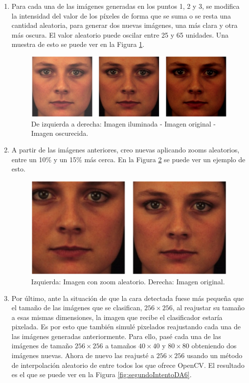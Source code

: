 \documentclass[a4paper,11pt]{book}
\begin{document}
\begin{enumerate}
	\item Para cada una de las imágenes generadas en los puntos 1, 2 y 3, se modifica la intensidad del valor de los píxeles de forma que se suma o se resta una cantidad aleatoria, para generar dos nuevas imágenes, una más clara y otra más oscura. El valor aleatorio puede oscilar entre 25 y 65 unidades. Una muestra de esto se puede ver en la Figura \ref{fig:segundoIntentoDA4}.
		\begin{figure}[h]
			\centering
			\includegraphics[width=0.9\linewidth]{imagenes/segundoIntentoDA4}
			\caption[Experimento 2 Iluminación]{De izquierda a derecha: Imagen iluminada - Imagen original - Imagen oscurecida.}
			\label{fig:segundoIntentoDA4}
		\end{figure}
	\item A partir de las imágenes anteriores, creo nuevas aplicando zooms aleatorios, entre un 10\% y un 15\% más cerca. En la Figura \ref{fig:segundoIntentoDA5} se puede ver un ejemplo de esto.
		\begin{figure}[h]
			\centering
			\includegraphics[width=0.7\linewidth]{imagenes/segundoIntentoDA5}
			\caption[Experimento 2 Zooms]{Izquierda: Imagen con zoom aleatorio. Derecha: Imagen original.}
			\label{fig:segundoIntentoDA5}
		\end{figure}
	\item Por último, ante la situación de que la cara detectada fuese más pequeña que el tamaño de las imágenes que se clasifican, \(256\times256\), al reajustar su tamaño a esas mismas dimensiones, la imagen que recibe el clasificador estaría pixelada. Es por esto que también simulé pixelados reajustando cada una de las imágenes generadas anteriormente. Para ello, pasé cada una de las imágenes de tamaño \(256\times256\) a tamaños \(40\times40\) y \(80\times80\) obteniendo dos imágenes nuevas. Ahora de nuevo las reajusté a \(256\times256\) usando un método de interpolación aleatorio de entre todos los que ofrece OpenCV\cite{opencvResize}. El resultado es el que se puede ver en la Figura \ref{fig:segundoIntentoDA6}.

\end{enumerate}
\end{document}
